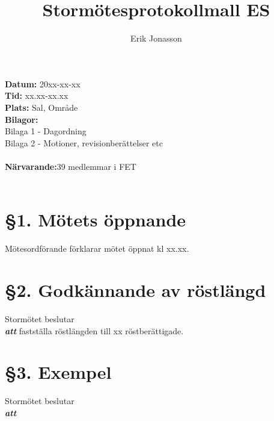 \documentclass[a4paper, 11pt]{article}
\title{Stormötesprotokollmall ES}
\author{Erik Jonasson}
\begin{document}
\pagestyle{style1}

\textbf{Datum:} 20xx-xx-xx\\
\textbf{Tid:} xx.xx-xx.xx\\
\textbf{Plats:} Sal, Område\\

\textbf{Bilagor:}\\ Bilaga 1 - Dagordning\\ %
Bilaga 2 - Motioner, revisionberättelser etc\\ %

\makebox[\linewidth]{\rule{\linewidth}{0.4pt}}\\
\textbf{Närvarande:}\hfill 39 medlemmar i FET\\
\makebox[\linewidth]{\rule{\linewidth}{0.4pt}}\\

\section*{§1. Mötets öppnande}
Mötesordförande förklarar mötet öppnat kl xx.xx.

\section*{§2. Godkännande av röstlängd}
Stormötet beslutar\\
\textbf{\textit{att}} fastställa röstlängden till xx röstberättigade.\\

\section*{§3. Exempel}
Stormötet beslutar\\
 \textbf{\textit{att}}
\end{document}
